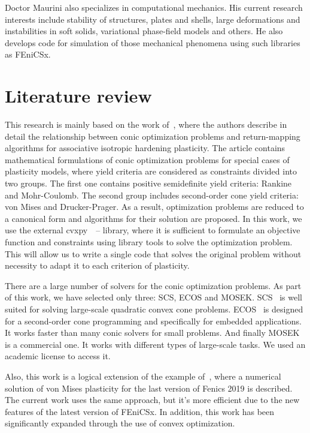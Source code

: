 \documentclass[12pt]{article}
\begin{document}
Doctor Maurini also specializes in computational mechanics. His current research interests include stability of structures, plates and shells, large deformations and instabilities in soft solids, variational phase-field models and others. He also develops code for simulation of those mechanical phenomena using such libraries as FEniCSx.

\newpage
\section{Literature review}

This research is mainly based on the work of~\textcite{BRUNO2020724}, where the authors describe in detail the relationship between conic optimization problems and return-mapping algorithms for associative isotropic hardening plasticity. The article contains mathematical formulations of conic optimization problems for special cases of plasticity models, where yield criteria are considered as constraints divided into two groups. The first one contains positive semidefinite yield criteria: Rankine and Mohr-Coulomb. The second group includes second-order cone yield criteria: von Mises and Drucker-Prager. As a result, optimization problems are reduced to a canonical form and algorithms for their solution are proposed. In this work, we use the external cvxpy~\parencite{diamond2016cvxpy}~--\parencite{agrawal2018rewriting} library, where it is sufficient to formulate an objective function and constraints using library tools to solve the optimization problem. This will allow us to write a single code that solves the original problem without necessity to adapt it to each criterion of plasticity.

There are a large number of solvers for the conic optimization problems. As part of this work, we have selected only three: SCS, ECOS and MOSEK. SCS~\parencite{ocpb:16} is well suited for solving large-scale quadratic convex cone problems. ECOS~\parencite{Domahidi2013ecos} is designed for a second-order cone programming and specifically for embedded applications. It works faster than many conic solvers for small problems. And finally MOSEK~\parencite{mosek} is a commercial one. It works with different types of large-scale tasks. We used an academic license to access it.

Also, this work is a logical extension of the example of~\textcite{bleyer2018numericaltours}, where a numerical solution of von Mises plasticity for the last version of Fenics 2019 is described. The current work uses the same approach, but it's more efficient due to the new features of the latest version of FEniCSx. In addition, this work has been significantly expanded through the use of convex optimization.
\end{document}
